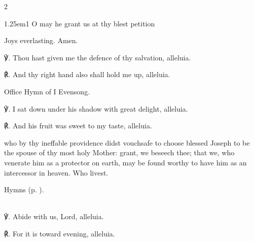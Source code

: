 \begin{paracol}{2}
\begin{hangparas}{1.25em}{1}
    O may he grant us at thy blest petition
    
       Joys everlasting. Amen.\\
\end{hangparas}


℣. Thou hast given me the defence of thy salvation, alleluia.

℟. And thy right hand also shall hold me up, alleluia.


\end{paracol}

\secondEvensong


\begin{rubric}
	Office Hymn of I Evensong.
\end{rubric}

℣. I sat down under his shadow with great delight, alleluia.

℟. And his fruit was sweet to my taste, alleluia.



\collect
{} who by thy ineffable providence didst vouchsafe to choose blessed Joseph to be the spouse of thy most holy Mother: grant, we beseech thee; that we, who venerate him as a protector on earth, may be found worthy to have him as an intercessor in heaven. Who livest.



\begin{rubric}
Hymns  (p. \pageref{EasterDay}).
\end{rubric}

\firstEvensong
{}\\

℣. Abide with us, Lord, alleluia.

℟. For it is toward evening, alleluia.


